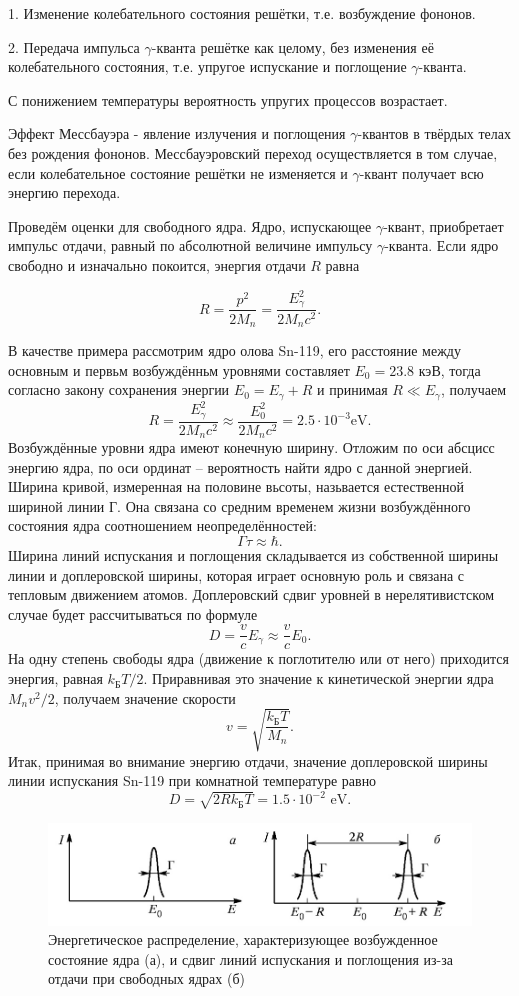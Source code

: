 \documentclass[a4paper, 12pt]{article}
\begin{document}
1. Изменение колебательного состояния решётки, т.е. возбуждение фононов.


2. Передача импульса $\gamma$-кванта решётке как целому, без изменения её колебательного состояния, т.е. упругое испускание и поглощение $\gamma$-кванта.


С понижением температуры вероятность упругих процессов возрастает.


Эффект Мессбауэра - явление излучения и поглощения $\gamma$-квантов в твёрдых телах без рождения фононов. Мессбауэровский переход осуществляется в том случае, если колебательное состояние решётки не изменяется и $\gamma$-квант получает всю энергию перехода.


Проведём оценки для свободного ядра. Ядро, испускающее $\gamma$-квант, приобретает импульс отдачи, равный по абсолютной величине импульсу $\gamma$-кванта. Если ядро свободно и изначально покоится, энергия отдачи $R$ равна

$$
R=\frac{p^2}{2M_n} = \frac{E_{\gamma}^2}{2M_nc^2}.
$$

В качестве примера рассмотрим ядро олова Sn-119, его расстояние между основным и первьм возбуждённьм уровнями составляет $E_{0}=23.8$ кэВ, тогда согласно закону сохранения энергии $E_{0}=E_{\gamma}+R$ и принимая $R \ll E_{\gamma}$, получаем
$$
R=\frac{E_{\gamma}^{2}}{2 M_{n} c^{2}} \approx \frac{E_{0}^{2}}{2 M_{n} c^{2}}=2.5 \cdot 10^{-3} \mathrm{ eV.}
$$
Возбуждённые уровни ядра имеют конечную ширину. Отложим по оси абсцисс энергию ядра, по оси ординат -- вероятность найти ядро с данной энергией. Ширина кривой, измеренная на половине вьсоты, назьвается естественной шириной линии Г. Она связана
со средним временем жизни возбуждённого состояния ядра соотношением
неопределённостей:
$$
\Gamma \tau \approx \hbar.
$$
Ширина линий испускания и поглощения складывается из собственной ширины линии и доплеровской ширины, которая играет основную роль и связана с тепловым движением атомов. Доплеровский сдвиг уровней в нерелятивистском случае будет рассчитываться по формуле
$$
D = \frac{v}{c} E_{\gamma} \approx \frac{v}{c} E_0.
$$
На одну степень свободы ядра (движение к поглотителю или от него) приходится энергия, равная $k_\text{Б}T/2$. Приравнивая это значение к кинетической энергии ядра $M_nv^2/2$, получаем значение скорости
$$
v = \sqrt{\frac{k_{\text{Б}}T}{M_n}}.
$$
Итак, принимая во внимание энергию отдачи, значение доплеровской ширины линии испускания Sn-119 при комнатной температуре равно
$$
D = \sqrt{2Rk_{\text{Б}}T} = 1.5 \cdot 10^{-2} \text{ eV}.
$$
\begin{figure}[h!]
\begin{center}
\includegraphics[scale=0.7]{1}
\caption{Энергетическое распределение, характеризующее возбужденное состояние ядра (а), и сдвиг линий испускания и поглощения из-за отдачи при свободных ядрах (б)}
\end{center}
\end{figure}
\end{document}

